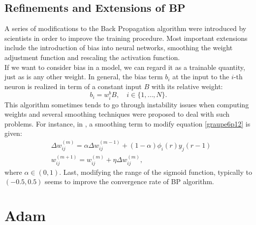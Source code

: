 \documentclass[%
    corpo=11pt,
    twoside,
    stile=classica,
    oldstyle,
    autoretitolo,
    tipotesi=magistrale,
    greek,
    evenboxes,
    english
]{toptesi}
\begin{document}
\subsection{Refinements and Extensions of BP}
A series of modifications to the Back Propagation algorithm were introduced by scientists in order to improve the training procedure. Most important extensions include the introduction of bias into neural networks, smoothing the weight adjustment function and rescaling the activation function. \\
If we want to consider bias in a model, we can regard it as a trainable quantity, just as is any other weight. In general, the bias term $b_i$ at the input to the $i$-th neuron is realized in term of a constant input $B$ with its relative weight:
\begin{equation}
b_i = w^b_i B, \quad i \in \{1,\dots,N\}.
\end{equation}
This algorithm sometimes tends to go through instability issues when computing weights and several smoothing techniques were proposed to deal with such problems. For instance, in \cite{sejnowski}, a smoothing term to modify equation \eqref{graupe6p12} is given:
\begin{align}
&\Delta w_{ij}^{(m)} = \alpha \Delta w_{ij}^{(m-1)} + (1-\alpha)\phi_i(r)y_j(r-1)  \nonumber \\
& w_{ij}^{(m+1)} = w_{ij}^{(m)} + \eta \Delta w_{ij}^{(m)},
\end{align}
where $\alpha \in \left(0,1 \right)$.
Last, modifying the range of the sigmoid function, typically to $\left(-0.5,0.5\right)$ seems to improve the convergence rate of BP algorithm. 
\newpage 

\section{Adam}
\end{document}
